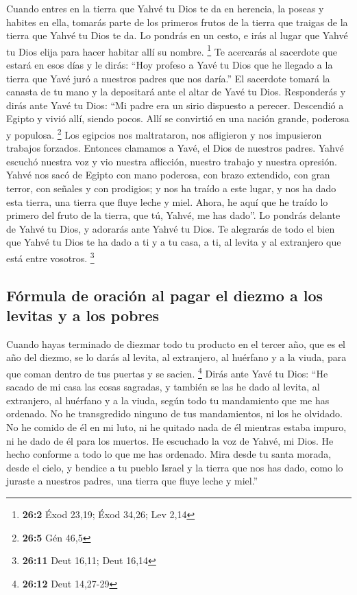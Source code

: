 \begin{paracol}{2}
 Cuando entres en la tierra que Yahvé tu Dios te da en
herencia, la poseas y habites en ella,  tomarás parte de
los primeros frutos de la tierra que traigas de la tierra que Yahvé tu
Dios te da. Lo pondrás en un cesto, e irás al lugar que Yahvé tu Dios
elija para hacer habitar allí su nombre. \footnote{\textbf{26:2} Éxod
  23,19; Éxod 34,26; Lev 2,14}  Te acercarás al sacerdote
que estará en esos días y le dirás: ``Hoy profeso a Yavé tu Dios que he
llegado a la tierra que Yavé juró a nuestros padres que nos daría.''
 El sacerdote tomará la canasta de tu mano y la depositará
ante el altar de Yavé tu Dios.  Responderás y dirás ante
Yavé tu Dios: ``Mi padre era un sirio dispuesto a perecer. Descendió a
Egipto y vivió allí, siendo pocos. Allí se convirtió en una nación
grande, poderosa y populosa. \footnote{\textbf{26:5} Gén 46,5}
 Los egipcios nos maltrataron, nos afligieron y nos
impusieron trabajos forzados.  Entonces clamamos a Yavé,
el Dios de nuestros padres. Yahvé escuchó nuestra voz y vio nuestra
aflicción, nuestro trabajo y nuestra opresión.  Yahvé nos
sacó de Egipto con mano poderosa, con brazo extendido, con gran terror,
con señales y con prodigios;  y nos ha traído a este
lugar, y nos ha dado esta tierra, una tierra que fluye leche y miel.
 Ahora, he aquí que he traído lo primero del fruto de la
tierra, que tú, Yahvé, me has dado''. Lo pondrás delante de Yahvé tu
Dios, y adorarás ante Yahvé tu Dios.  Te alegrarás de
todo el bien que Yahvé tu Dios te ha dado a ti y a tu casa, a ti, al
levita y al extranjero que está entre vosotros. \footnote{\textbf{26:11}
  Deut 16,11; Deut 16,14}

\hypertarget{fuxf3rmula-de-oraciuxf3n-al-pagar-el-diezmo-a-los-levitas-y-a-los-pobres}{%
\subsection{Fórmula de oración al pagar el diezmo a los levitas y a los
pobres}\label{fuxf3rmula-de-oraciuxf3n-al-pagar-el-diezmo-a-los-levitas-y-a-los-pobres}}

 Cuando hayas terminado de diezmar todo tu producto en el
tercer año, que es el año del diezmo, se lo darás al levita, al
extranjero, al huérfano y a la viuda, para que coman dentro de tus
puertas y se sacien. \footnote{\textbf{26:12} Deut 14,27-29}
 Dirás ante Yavé tu Dios: ``He sacado de mi casa las
cosas sagradas, y también se las he dado al levita, al extranjero, al
huérfano y a la viuda, según todo tu mandamiento que me has ordenado. No
he transgredido ninguno de tus mandamientos, ni los he olvidado.
 No he comido de él en mi luto, ni he quitado nada de él
mientras estaba impuro, ni he dado de él para los muertos. He escuchado
la voz de Yahvé, mi Dios. He hecho conforme a todo lo que me has
ordenado.  Mira desde tu santa morada, desde el cielo, y
bendice a tu pueblo Israel y la tierra que nos has dado, como lo juraste
a nuestros padres, una tierra que fluye leche y miel.''


\end{paracol}
